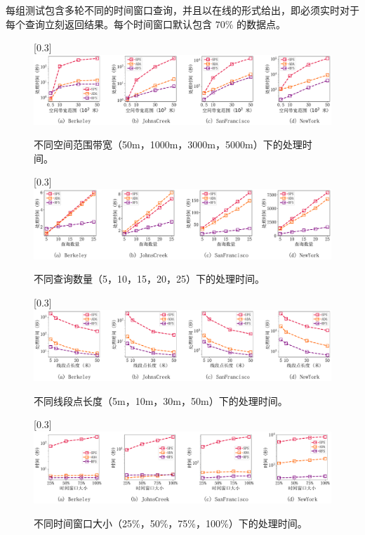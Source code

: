 每组测试包含多轮不同的时间窗口查询，并且以在线的形式给出，即必须实时对于每个查询立刻返回结果。每个时间窗口默认包含 $70\%$ 的数据点。

\begin{figure}[p!]\centering
	\hspace{-8pt}
	\scalebox{0.3}[0.3]{\includegraphics{./figures/EXP_Bandwidth_R_zh.pdf}}
	\vspace{-8pt}
	\caption{不同空间范围带宽（50m，1000m，3000m，5000m）下的处理时间。}
	\label{exp1.1}
	
	\vspace{10pt}
	\scalebox{0.3}[0.3]{\includegraphics{./figures/EXP_Bandwidth_W_zh.pdf}}
	\vspace{-8pt}
	\caption{不同查询数量（5，10，15，20，25）下的处理时间。}
	\label{exp1.2}
	
	\vspace{10pt}
	\scalebox{0.3}[0.3]{\includegraphics{./figures/EXP_Bandwidth_L_zh.pdf}}
	\vspace{-8pt}
	\caption{不同线段点长度（5m，10m，30m，50m）下的处理时间。}
	\label{exp1.3}
	
	\vspace{10pt}
	\scalebox{0.3}[0.3]{\includegraphics{./figures/EXP_Bandwidth_P_zh.pdf}}
	\vspace{-8pt}
	\caption{不同时间窗口大小（25\%，50\%，75\%，100\%）下的处理时间。}
	\label{exp1.4}
\end{figure}


